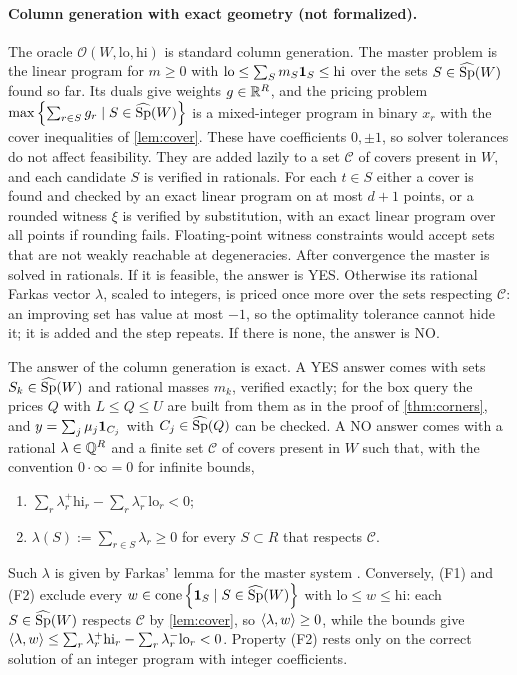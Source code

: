 \paragraph{Column generation with exact geometry (not formalized).}
The oracle $\mathcal O(W,\mathrm{lo},\mathrm{hi})$ is standard column generation. The master problem is the linear program for $m\ge0$ with $\mathrm{lo}\le\sum_Sm_S\mathbf 1_{S}\le\mathrm{hi}$ over the sets $S\in\widehat{\operatorname{Sp}}(W)$ found so far. Its duals give weights $g\in\mathbb{R}^R$, and the pricing problem $\max\left\{ \sum_{r\in S}g_r\mid S\in\widehat{\operatorname{Sp}}(W) \right\}$ is a mixed-integer program in binary $x_r$ with the cover inequalities of \cref{lem:cover}. These have coefficients $0,\pm1$, so solver tolerances do not affect feasibility. They are added lazily to a set $\mathcal C$ of covers present in $W$, and each candidate $S$ is verified in rationals. For each $t\in S$ either a cover is found and checked by an exact linear program on at most $d+1$ points, or a rounded witness $\xi$ is verified by substitution, with an exact linear program over all points if rounding fails. Floating-point witness constraints would accept sets that are not weakly reachable at degeneracies. After convergence the master is solved in rationals. If it is feasible, the answer is YES. Otherwise its rational Farkas vector $\lambda$, scaled to integers, is priced once more over the sets respecting $\mathcal C$: an improving set has value at most $-1$, so the optimality tolerance cannot hide it; it is added and the step repeats. If there is none, the answer is NO.

\begin{proposition}\label{prop:oracle}
The answer of the column generation is exact. A YES answer comes with sets $S_k\in\widehat{\operatorname{Sp}}(W)$ and rational masses $m_k$, verified exactly; for the box query the prices $Q$ with $L\le Q\le U$ are built from them as in the proof of \cref{thm:corners}, and $y=\sum_j\mu_j\mathbf 1_{C_j}$ with $C_j\in\widehat{\operatorname{Sp}}(Q)$ can be checked. A NO answer comes with a rational $\lambda\in\mathbb{Q}^R$ and a finite set $\mathcal C$ of covers present in $W$ such that, with the convention $0\cdot\infty=0$ for infinite bounds,
\begin{enumerate}[label=(F\arabic*)]
\item $\sum_r\lambda_r^+\mathrm{hi}_r-\sum_r\lambda_r^-\mathrm{lo}_r<0$;
\item $\lambda(S):=\sum_{r\in S}\lambda_r\ge0$ for every $S\subset R$ that respects $\mathcal C$.
\end{enumerate}
Such $\lambda$ is given by Farkas' lemma for the master system \citep[Cor.~7.1d]{Schrijver1986}. Conversely, (F1) and (F2) exclude every $w\in\operatorname{cone}\left\{ \mathbf 1_{S}\mid S\in\widehat{\operatorname{Sp}}(W) \right\}$ with $\mathrm{lo}\le w\le\mathrm{hi}$: each $S\in\widehat{\operatorname{Sp}}(W)$ respects $\mathcal C$ by \cref{lem:cover}, so $\langle \lambda, w\rangle\ge0$, while the bounds give $\langle \lambda, w\rangle\le\sum_r\lambda_r^+\mathrm{hi}_r-\sum_r\lambda_r^-\mathrm{lo}_r<0$. Property (F2) rests only on the correct solution of an integer program with integer coefficients.
\end{proposition}

